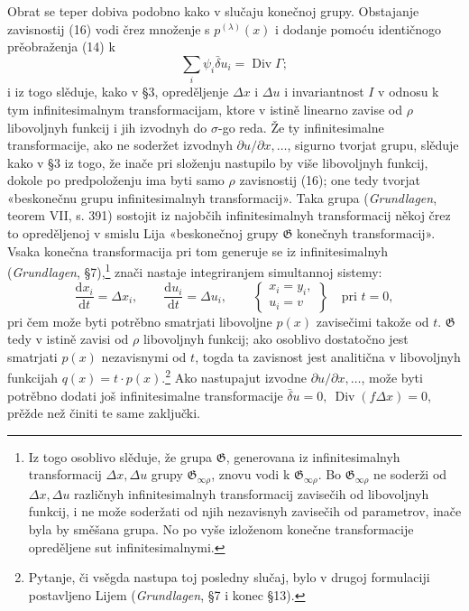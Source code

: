 \documentclass[11pt]{article}
\providecommand{\G}{\mathfrak G}
\providecommand{\D}{\Delta}
\providecommand{\p}{\partial}
\providecommand{\dd}{\mathrm d}
\DeclareMathOperator{\Div}{Div}
\providecommand{\bd}{\bar{\delta}}
\begin{document}
Obrat se teper dobiva podobno kako v slučaju konečnoj grupy. Obstajanje zavisnostij (16) vodi črez množenje s \(p^{(\lambda)}(x)\) i dodanje pomoću identičnogo prěobraženja (14) k
\[
\sum_i\psi_i\bd u_i=\Div\Gamma;
\]
i iz togo slěduje, kako v \S{}3, opreděljenje \(\D x\) i \(\D u\) i invariantnost \(I\) v odnosu k tym infinitesimalnym transformacijam, ktore v istině linearno zavise od \(\rho\) libovoljnyh funkcij i jih izvodnyh do \(\sigma\)-go reda. Že ty infinitesimalne transformacije, ako ne soderžet izvodnyh \(\p u/\p x,\ldots\), sigurno tvorjat grupu, slěduje kako v \S{}3 iz togo, že inače pri složenju nastupilo by više libovoljnyh funkcij, dokole po predpoloženju ima byti samo \(\rho\) zavisnostij (16); one tedy tvorjat «beskonečnu grupu infinitesimalnyh transformacij». Taka grupa (\emph{Grundlagen}, teorem VII, s. 391) sostojit iz najobčih infinitesimalnyh transformacij někoj črez to opreděljenoj v smislu Lija «beskonečnoj grupy \(\G\) konečnyh transformacij». Vsaka konečna transformacija pri tom generuje se iz infinitesimalnyh (\emph{Grundlagen}, \S{}7),\footnote{Iz togo osoblivo slěduje, že grupa \(\G\), generovana iz infinitesimalnyh transformacij \(\D x,\D u\) grupy \(\G_{\infty\rho}\), znovu vodi k \(\G_{\infty\rho}\). Bo \(\G_{\infty\rho}\) ne soderži od \(\D x,\D u\) različnyh infinitesimalnyh transformacij zavisečih od libovoljnyh funkcij, i ne može soderžati od njih nezavisnyh zavisečih od parametrov, inače byla by směšana grupa. No po vyše izloženom konečne transformacije opreděljene sut infinitesimalnymi.} znači nastaje integriranjem simultannoj sistemy:
\[
\frac{\dd x_i}{\dd t}=\D x_i,\qquad
\frac{\dd u_i}{\dd t}=\D u_i,\qquad
\left\{\begin{array}{l}
x_i=y_i,\\
u_i=v
\end{array}\right\}
\quad\text{pri }t=0,
\]
pri čem može byti potrěbno smatrjati libovoljne \(p(x)\) zavisečimi takože od \(t\). \(\G\) tedy v istině zavisi od \(\rho\) libovoljnyh funkcij; ako osoblivo dostatočno jest smatrjati \(p(x)\) nezavisnymi od \(t\), togda ta zavisnost jest analitična v libovoljnyh funkcijah \(q(x)=t\cdot p(x)\).\footnote{Pytanje, či vsěgda nastupa toj posledny slučaj, bylo v drugoj formulaciji postavljeno Lijem (\emph{Grundlagen}, \S{}7 i konec \S{}13).} Ako nastupajut izvodne \(\p u/\p x,\ldots\), može byti potrěbno dodati još infinitesimalne transformacije \(\bd u=0,\ \Div(f\D x)=0\), prěžde než činiti te same zaključki.
\end{document}
